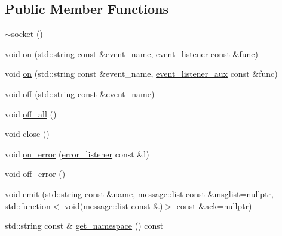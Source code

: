 \subsection*{Public Member Functions}
\begin{DoxyCompactItemize}
\item 
\hyperlink{classsio_1_1socket_a801ded60fce567ad253a3c2740b79ddf}{$\sim$socket} ()
\item 
void \hyperlink{classsio_1_1socket_ab7b366ed08cef9820db1bd019a8c06ec}{on} (std\+::string const \&event\+\_\+name, \hyperlink{classsio_1_1socket_ae0b1d93ef97af0d6d4f588e1e2a103b5}{event\+\_\+listener} const \&func)
\item 
void \hyperlink{classsio_1_1socket_a6d3adaddc50f1a407e58d74b6d3d1367}{on} (std\+::string const \&event\+\_\+name, \hyperlink{classsio_1_1socket_a426d9236f95762375d3b86caa2b4faaf}{event\+\_\+listener\+\_\+aux} const \&func)
\item 
void \hyperlink{classsio_1_1socket_a7be26cf14d0611636c486a11a2b2ac02}{off} (std\+::string const \&event\+\_\+name)
\item 
void \hyperlink{classsio_1_1socket_a34e500f6baec2a9619887aa97cd7b794}{off\+\_\+all} ()
\item 
void \hyperlink{classsio_1_1socket_ae5073be58def64d16ead9806c24df8ec}{close} ()
\item 
void \hyperlink{classsio_1_1socket_a2296dfef16e09b35201866d2cba15a14}{on\+\_\+error} (\hyperlink{classsio_1_1socket_aecfea28271032e09dde1567bbfa97898}{error\+\_\+listener} const \&l)
\item 
void \hyperlink{classsio_1_1socket_a5528f1721aafc0cdd20effb9a80db087}{off\+\_\+error} ()
\item 
void \hyperlink{classsio_1_1socket_a76a3f52dec0e3fc16721183faa0e3def}{emit} (std\+::string const \&name, \hyperlink{classsio_1_1message_1_1list}{message\+::list} const \&msglist=nullptr, std\+::function$<$ void(\hyperlink{classsio_1_1message_1_1list}{message\+::list} const \&)$>$ const \&ack=nullptr)
\item 
std\+::string const  \& \hyperlink{classsio_1_1socket_ae0c48ebc168d677baaaefe45217f1185}{get\+\_\+namespace} () const
\end{DoxyCompactItemize}
